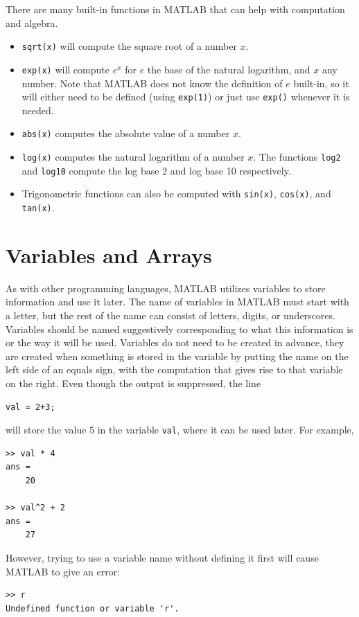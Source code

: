 \documentclass{ximera}
\begin{document}
There are many built-in functions in MATLAB that can help with computation and algebra. 
\begin{itemize}
    \item \texttt{sqrt(x)} will compute the square root of a number $x$.
    \item \texttt{exp(x)} will compute $e^x$ for $e$ the base of the natural logarithm, and $x$ any number. Note that MATLAB does not know the definition of $e$ built-in, so it will either need to be defined (using \texttt{exp(1)}) or just use \texttt{exp()} whenever it is needed. 
    \item \texttt{abs(x)} computes the absolute value of a number $x$.
    \item \texttt{log(x)} computes the natural logarithm of a number $x$. The functions \texttt{log2} and \texttt{log10} compute the log base 2 and log base 10 respectively.
    \item Trigonometric functions can also be computed with \texttt{sin(x)}, \texttt{cos(x)}, and \texttt{tan(x)}.
\end{itemize}

\section{Variables and Arrays}

As with other programming languages, MATLAB utilizes variables to store information and use it later. The name of variables in MATLAB must start with a letter, but the rest of the name can consist of letters, digits, or underscores. Variables should be named suggestively corresponding to what this information is or the way it will be used. Variables do not need to be created in advance, they are created when something is stored in the variable by putting the name on the left side of an equals sign, with the computation that gives rise to that variable on the right. Even though the output is suppressed, the line
\begin{verbatim}
val = 2+3;
\end{verbatim}
will store the value 5 in the variable \texttt{val}, where it can be used later. For example,
\begin{verbatim}
>> val * 4
ans = 
    20
    
>> val^2 + 2
ans = 
    27
\end{verbatim}
However, trying to use a variable name without defining it first will cause MATLAB to give an error:
\begin{verbatim}
>> r
Undefined function or variable 'r'.
\end{verbatim}
\end{document}
